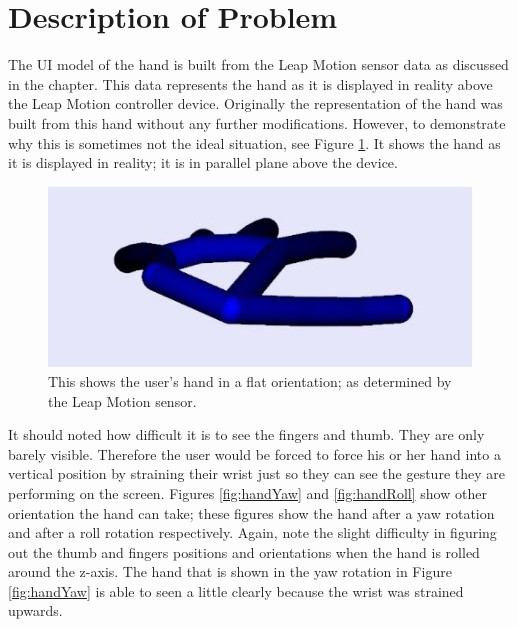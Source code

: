 \section{Description of Problem}
The UI model of the hand is built from the Leap Motion sensor data as discussed in the chapter. This data represents the hand as it is displayed in reality above the Leap Motion controller device. Originally the representation of the hand was built from this hand without any further modifications. However, to demonstrate why this is sometimes not the ideal situation, see Figure \ref{fig:handFlat}. It shows the hand as it is displayed in reality; it is in parallel plane above the device. 
\begin{figure}[H]
\centering
\includegraphics[scale=0.45]{Figures/4_handFlat.JPG}
\caption[Hand in Flat Orientation]{This shows the user's hand in a flat orientation; as determined by the Leap Motion sensor.}
\label{fig:handFlat}
\end{figure}
It should noted how difficult it is to see the fingers and thumb. They are only barely visible. Therefore the user would be forced to force his or her hand into a vertical position by straining their wrist just so they can see the gesture they are performing on the screen. Figures \ref{fig:handYaw} and \ref{fig:handRoll} show other orientation the hand can take; these figures show the hand after a yaw rotation and after a roll rotation respectively. Again, note the slight difficulty in figuring out the thumb and fingers positions and orientations when the hand is rolled around the z-axis. The hand that is shown in the yaw rotation in Figure \ref{fig:handYaw} is able to seen a little clearly because the wrist was strained upwards. 

